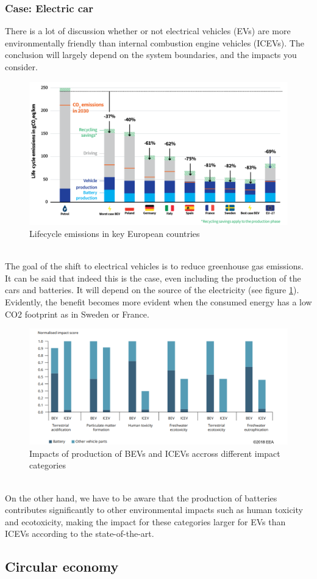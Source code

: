 \documentclass[../summary.tex]{subfiles}
\begin{document}
\subsubsection{Case: Electric car}

There is a lot of discussion whether or not electrical vehicles (EVs) are more environmentally friendly than internal combustion engine vehicles (ICEVs). The conclusion will largely depend on the system boundaries, and the impacts you consider.

\begin{figure}[H]
	\centering
	\includegraphics[width=0.9\linewidth]{../images/lca_emissions_electric_cars}
	\caption{Lifecycle emissions in key European countries}
	\label{fig:lcaemissionselectriccars}
\end{figure}
\ \\
The goal of the shift to electrical vehicles is to reduce greenhouse gas emissions. It can be said that indeed this is the case, even including the production of the cars and batteries. It will depend on the source of the electricity (see figure \ref{fig:lcaemissionselectriccars}). Evidently, the benefit becomes more evident when the consumed energy has a low CO2 footprint as in Sweden or France.

\begin{figure}[H]
	\centering
	\includegraphics[width=0.9\linewidth]{../images/impacts_of_production_of_ICEV_and_BEV}
	\caption{Impacts of production of BEVs and ICEVs accross different impact categories}
	\label{fig:impactsofproductionoficevandbev}
\end{figure}
\ \\
On the other hand, we have to be aware that the production of batteries contributes significantly to other environmental impacts such as human toxicity and ecotoxicity, making the impact for these categories larger for EVs than ICEVs according to the state-of-the-art.

\subsection{Circular economy}
\end{document}
